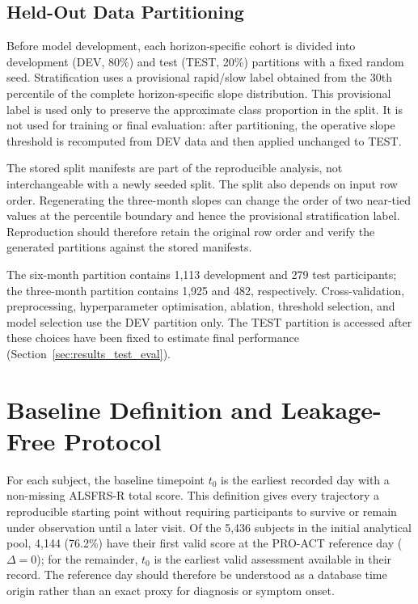 \subsection{Held-Out Data Partitioning}
\label{sec:methods_holdout}
Before model development, each horizon-specific cohort is divided into development (\gls{DEV}, 80\%) and test (\gls{TEST}, 20\%) partitions with a fixed random seed. Stratification uses a provisional rapid/slow label obtained from the 30th percentile of the complete horizon-specific slope distribution. This provisional label is used only to preserve the approximate class proportion in the split. It is not used for training or final evaluation: after partitioning, the operative slope threshold is recomputed from \gls{DEV} data and then applied unchanged to \gls{TEST}.

The stored split manifests are part of the reproducible analysis, not interchangeable with a newly seeded split. The split also depends on input row order. Regenerating the three-month slopes can change the order of two near-tied values at the percentile boundary and hence the provisional stratification label. Reproduction should therefore retain the original row order and verify the generated partitions against the stored manifests.

The six-month partition contains 1,113 development and 279 test participants; the three-month partition contains 1,925 and 482, respectively. Cross-validation, preprocessing, hyperparameter optimisation, ablation, threshold selection, and model selection use the \gls{DEV} partition only. The \gls{TEST} partition is accessed after these choices have been fixed to estimate final performance (Section~\ref{sec:results_test_eval}).

\section{Baseline Definition and Leakage-Free Protocol}
\label{sec:methods_baseline}
For each subject, the baseline timepoint $t_0$ is the earliest recorded day with a non-missing \gls{ALSFRS-R} total score. This definition gives every trajectory a reproducible starting point without requiring participants to survive or remain under observation until a later visit. Of the 5,436 subjects in the initial analytical pool, 4,144 (76.2\%) have their first valid score at the \gls{PRO-ACT} reference day ($\Delta=0$); for the remainder, $t_0$ is the earliest valid assessment available in their record. The reference day should therefore be understood as a database time origin rather than an exact proxy for diagnosis or symptom onset.

